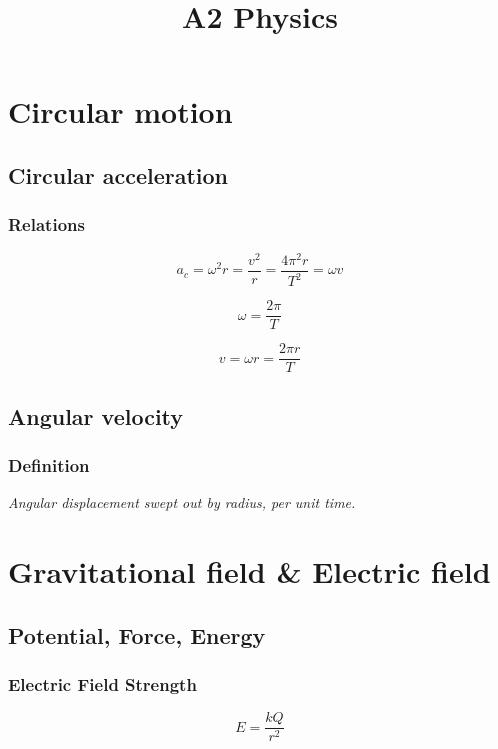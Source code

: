 \documentclass[a4paper,9pt]{scrartcl}
\title{A2 Physics}
\begin{document}
    \section{Circular motion}

    \subsection{Circular acceleration}

    \subsubsection{Relations}
    \begin{displaymath}
        a_c = \omega^{2}r = \frac{v^2}{r} = \frac{4\pi^{2}r}{T^{2}} = {\omega}v
    \end{displaymath}

    \begin{displaymath}
        \omega = \frac{2\pi}{T}
    \end{displaymath}

    \begin{displaymath}
        v = {\omega}r = \frac{2{\pi}r}{T}
    \end{displaymath}

    \subsection{Angular velocity}

    \subsubsection{Definition}
    \textit{Angular displacement swept out by radius, per unit time.}


    \section{Gravitational field \& Electric field}

    \subsection{Potential, Force, Energy}

    \subsubsection{Electric Field Strength}
    \begin{displaymath}
        E = \frac{kQ}{r^2}
    \end{displaymath}
\end{document}
